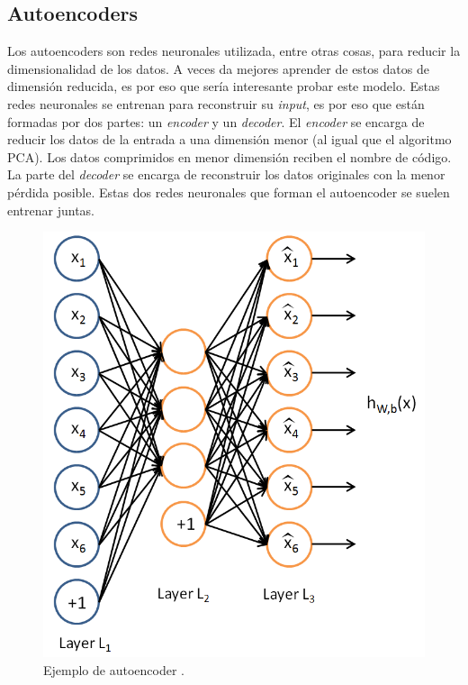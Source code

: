 \subsection{Autoencoders}

Los autoencoders son redes neuronales utilizada, entre otras cosas, para reducir la dimensionalidad de los datos. A veces da mejores aprender de estos datos de dimensión reducida, es por eso que sería interesante probar este modelo. Estas redes neuronales se entrenan para reconstruir su \textit{input}, es por eso que están formadas por dos partes: un \textit{encoder} y un \textit{decoder}. El \textit{encoder} se encarga de reducir los datos de la entrada a una dimensión menor (al igual que el algoritmo PCA). Los datos comprimidos en menor dimensión reciben el nombre de código. La parte del \textit{decoder} se encarga de reconstruir los datos originales con la menor pérdida posible. Estas dos redes neuronales que forman el autoencoder se suelen entrenar juntas.

\begin{figure}[H]
	\includegraphics[scale=0.3]{imagenes/03_Estado_del_arte/autoencoder.png}
	\centering
	\caption{Ejemplo de autoencoder \cite{vae}.}
	\label{fig:autoencoder}
\end{figure}

